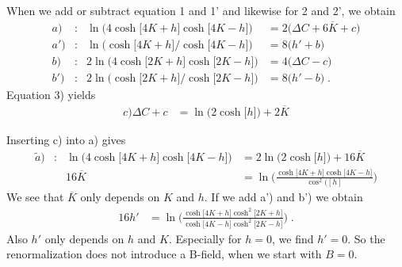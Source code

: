 %
When we add or subtract equation 1 and 1' and likewise for 2 and 2', we obtain
%
\begin{align*}
a)&:& \ln\bigg(4\cosh\big[4 K+h  \big] \cosh\big[4 K-h  \big] \bigg) &= 2\bigg( 
  \Delta C + 6\overline K +c   \bigg)\\
a')&:&  \ln\bigg(\cosh\big[4 K+h  \big]/ \cosh\big[4 K-h  \big] \bigg) &= 8\big( h' +b
 \big)\\
b)&:&2\ln\bigg(4\cosh\big[2 K+h  \big]\cosh\big[2 K-h  \big]  \bigg) &=
4\bigg( \Delta C -c \bigg)\\
b')&:&2\ln\bigg(\cosh\big[2 K+h  \big]/\cosh\big[2 K-h  \big]  \bigg) &=
8\bigg(h' -b \bigg)\;.
\end{align*}
Equation 3) yields
%
\begin{align*}
c)\Delta C +c   &=
\ln\bigg(2\cosh\big[h  \big]  \bigg) + 2 \overline K
\end{align*}
%
  
%
Inserting c) into a) gives
\begin{align*}
\tilde a)&:& \ln\bigg(4\cosh\big[4 K+h  \big] \cosh\big[4 K-h  \big] \bigg) &= 2
 \ln\bigg(2\cosh\big[h  \big]  \bigg)+ 16\overline K   \\
&&16 \overline K &= \ln\bigg(
\frac{\cosh\big[4 K+h  \big] \cosh\big[4 K-h  \big] }{\cos^{2}([h]}
  \bigg)
\end{align*}
%
We see that $\overline K$ only depends on $K$ and $h$.
If we add a') and b') we obtain
%
\begin{align*}
16 h' &=
\ln\bigg( 
\frac{\cosh\big[4 K+h  \big]\cosh^{2}\big[2 K+h  \big]}{\cosh\big[4 K-h  \big]\cosh^{2}\big[2 K-h  \big]  }
 \bigg)\;.
\end{align*}
%
Also $h'$ only depends on $h$ and $K$. Especially for $h=0$, we find $h'=0$. So 
the renormalization does not introduce a B-field, when we start with $B=0$. 

